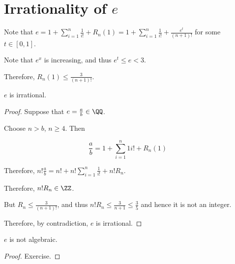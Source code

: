 \documentclass[11pt]{scrartcl}
\begin{document}
\section{Irrationality of $e$}

Note that
$e = 1+ \sum_{i=1}^n\frac{1}{i!}+ R_n(1) = 1+
\sum_{i=1}^n\frac{1}{i!}+ \frac{e^t}{(n+1)!}$ for some $t\in[0, 1]$.

Note that $e^{x}$ is increasing, and thus $e^t\leq e < 3$.

Therefore, $R_n(1) \leq \frac{3}{(n+1)!}$.

\begin{theorem}
$e$ is irrational.
\end{theorem}

\begin{proof}
  \hfill

  Suppose that $e = \frac{a}{b}\in\QQ$.

  Choose $n> b$, $n \geq 4$. Then
  
  \begin{equation*}
    \frac{a}{b} = 1+ \sum_{i=1}^n{1}{i!} + R_n(1)
  \end{equation*}

  Therefore, $n! \frac{a}{b} = n! + n! \sum_{i=1}^{n} \frac{1}{i!}+ n! R_{n}$.

  Therefore, $n!R_n \in \ZZ$.

  But $R_n \leq \frac{3}{(n+1)!}$, and thus
  $n!R_n \leq \frac{3}{n+1} \leq \frac{3}{5}$ and hence it is not an
  integer.

  Therefore, by contradiction, $e$ is irrational.
\end{proof}

\begin{theorem}
$e$ is not algebraic.
\end{theorem}

\begin{proof}
  \hfill

Exercise.
\end{proof}
\end{document}
